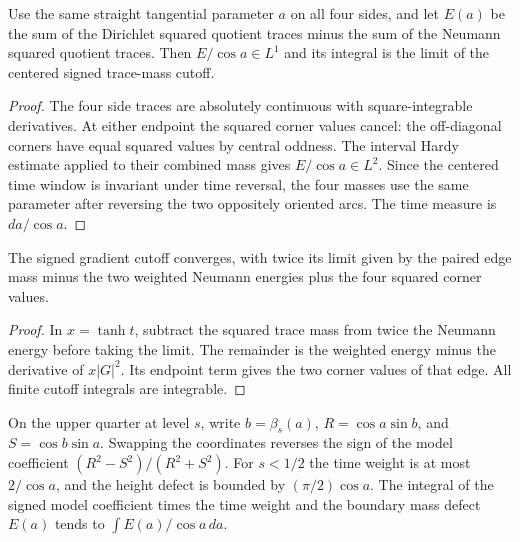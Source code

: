 \begin{lemma}
\label{lem:mixed-edge-mass}
\leanok
Use the same straight tangential parameter $a$ on all four sides, and let
$E(a)$ be the sum of the Dirichlet squared quotient traces minus the sum
of the Neumann squared quotient traces. Then $E/\cos a\in L^1$ and its
integral is the limit of the centered signed trace-mass cutoff.
\end{lemma}

\begin{proof}
\leanok
The four side traces are absolutely continuous with square-integrable
derivatives. At either endpoint the squared corner values cancel: the
off-diagonal corners have equal squared values by central oddness.
The interval Hardy estimate applied to their combined mass gives
$E/\cos a\in L^2$. Since the centered time window is invariant under time
reversal, the four masses use the same parameter after reversing the
two oppositely oriented arcs. The time measure is $da/\cos a$.
\end{proof}

\begin{lemma}
\label{lem:mixed-gradient-cutoff}
\leanok
The signed gradient cutoff converges, with twice its limit given by
the paired edge mass minus the two weighted Neumann energies plus the
four squared corner values.
\end{lemma}

\begin{proof}
\leanok
In $x=\tanh t$, subtract the squared trace mass from twice the Neumann
energy before taking the limit. The remainder is the weighted energy
minus the derivative of $x|G|^2$. Its endpoint term gives the two corner
values of that edge. All finite cutoff integrals are integrable.
\end{proof}

\begin{lemma}
\label{lem:mixed-level-model}
\leanok
On the upper quarter at level $s$, write $b=\beta_s(a)$,
$R=\cos a\sin b$, and $S=\cos b\sin a$. Swapping the coordinates reverses
the sign of the model coefficient $(R^2-S^2)/(R^2+S^2)$.
For $s<1/2$ the time weight is at most $2/\cos a$, and the height defect
is bounded by $(\pi/2)\cos a$. The integral of the signed model coefficient
times the time weight and the boundary mass defect $E(a)$ tends to
$\int E(a)/\cos a\,da$.
\end{lemma}

